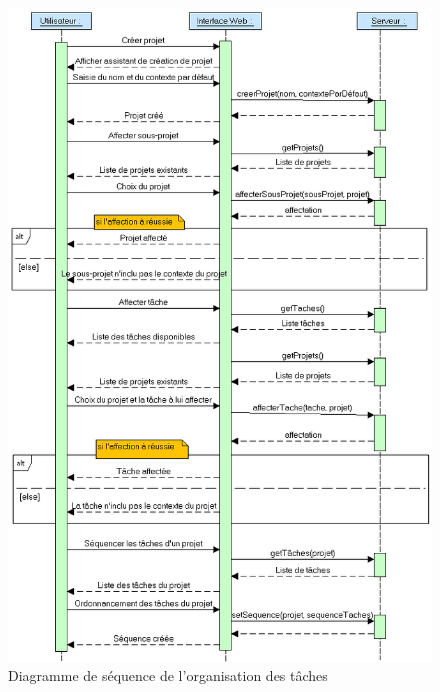 		\begin{figure}[H]
			\begin{center}
				\includegraphics[scale=0.7]{diagrams/scenarOrganize.png}
				\caption{Diagramme de séquence de l'organisation des tâches}
			\end{center}
		\end{figure}		

